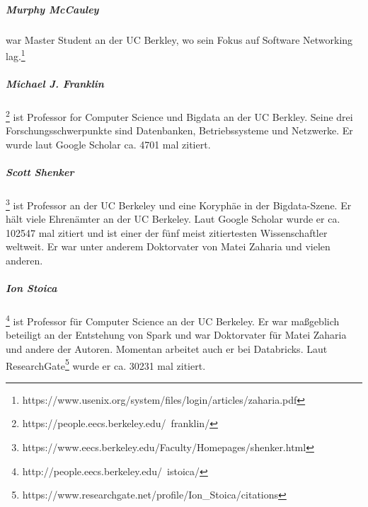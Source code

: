 \subparagraph{Murphy McCauley} war Master Student an der UC Berkley, wo sein Fokus auf Software Networking lag.\footnote{https://www.usenix.org/system/files/login/articles/zaharia.pdf}


\subparagraph{Michael J. Franklin} \footnote{https://people.eecs.berkeley.edu/~franklin/} ist Professor for Computer Science und Bigdata an der UC Berkley. Seine drei Forschungsschwerpunkte sind Datenbanken, Betriebssysteme und Netzwerke. Er wurde laut Google Scholar ca. 4701 mal zitiert.

\subparagraph{Scott Shenker} \footnote{https://www.eecs.berkeley.edu/Faculty/Homepages/shenker.html} ist Professor an der UC Berkeley und eine Koryphäe in der Bigdata-Szene. Er hält viele Ehrenämter an der UC Berkeley. Laut Google Scholar wurde er ca. 102547 mal zitiert und ist einer der fünf meist zitiertesten Wissenschaftler weltweit. Er war unter anderem Doktorvater von Matei Zaharia und vielen anderen.


\subparagraph{Ion Stoica} \footnote{http://people.eecs.berkeley.edu/~istoica/} ist Professor für Computer Science an der UC Berkeley. Er war maßgeblich beteiligt an der Entstehung von Spark und war Doktorvater für Matei Zaharia und andere der Autoren. Momentan arbeitet auch er bei Databricks. Laut ResearchGate\footnote{https://www.researchgate.net/profile/Ion\_Stoica/citations} wurde er ca. 30231 mal zitiert.



